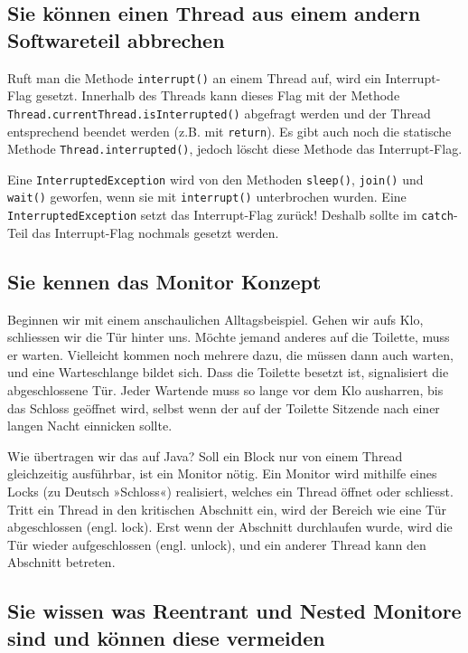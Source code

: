 \subsection{Sie können einen Thread aus einem andern Softwareteil abbrechen}

Ruft man die Methode \texttt{interrupt()} an einem Thread auf, wird ein Interrupt-Flag gesetzt. Innerhalb des Threads kann dieses Flag mit der Methode \texttt{Thread.currentThread.isInterrupted()} abgefragt werden und der Thread entsprechend beendet werden (z.B. mit \texttt{return}). Es gibt auch noch die statische Methode \texttt{Thread.interrupted()}, jedoch löscht diese Methode das Interrupt-Flag.

Eine \texttt{InterruptedException} wird von den Methoden \texttt{sleep()}, \texttt{join()} und \texttt{wait()} geworfen, wenn sie mit \texttt{interrupt()} unterbrochen wurden. Eine \texttt{InterruptedException} setzt das Interrupt-Flag zurück! Deshalb sollte im \texttt{catch}-Teil das Interrupt-Flag nochmals gesetzt werden.

\subsection{Sie kennen das Monitor Konzept}

Beginnen wir mit einem anschaulichen Alltagsbeispiel. Gehen wir aufs Klo, schliessen wir die Tür hinter uns. Möchte jemand anderes auf die Toilette, muss er warten. Vielleicht kommen noch mehrere dazu, die müssen dann auch warten, und eine Warteschlange bildet sich. Dass die Toilette besetzt ist, signalisiert die abgeschlossene Tür. Jeder Wartende muss so lange vor dem Klo ausharren, bis das Schloss geöffnet wird, selbst wenn der auf der Toilette Sitzende nach einer langen Nacht einnicken sollte.

Wie übertragen wir das auf Java? Soll ein Block nur von einem Thread gleichzeitig ausführbar, ist ein Monitor nötig. Ein Monitor wird mithilfe eines Locks (zu Deutsch »Schloss«) realisiert, welches ein Thread öffnet oder schliesst. Tritt ein Thread in den kritischen Abschnitt ein, wird der Bereich wie eine Tür abgeschlossen (engl. lock). Erst wenn der Abschnitt durchlaufen wurde, wird die Tür wieder aufgeschlossen (engl. unlock), und ein anderer Thread kann den Abschnitt betreten.

\subsection{Sie wissen was Reentrant und Nested Monitore sind und können diese vermeiden}


